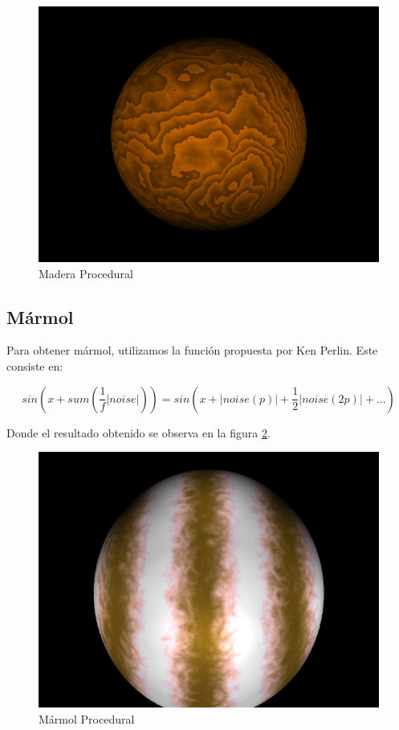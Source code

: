 \documentclass[a4paper,10pt]{article}
\begin{document}
\begin{figure}[h!]
 \centering
 \includegraphics[scale=0.5]{./proceduralWood.png}
 \caption{Madera Procedural}
 \label{fig:figure5}
\end{figure}

\subsection{Mármol}

Para obtener mármol, utilizamos la función propuesta por Ken Perlin.  Este
consiste en:

\begin{equation}
 sin ( x + sum (\frac{1}{f} |noise| )) = sin( x  +  |noise(p)| + \frac{1}{2}
|noise(2p)| + ...)
\end{equation}

Donde el resultado obtenido se observa en la figura \ref{fig:figure6}.

\begin{figure}[h!]
 \centering
 \includegraphics[scale=0.5]{./proceduralMarble.png}
 \caption{Mármol Procedural}
 \label{fig:figure6}
\end{figure}
\end{document}
